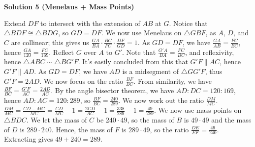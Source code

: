 \begin{enumerate}
\textbf{Solution 5 (Menelaus + Mass Points)}

Extend $DF$ to intersect with the extension of $AB$ at $G$. Notice that $\triangle{BDF} \cong \triangle{BDG}$, so $GD=DF$. We now use Menelaus on $\triangle{GBF}$, as $A$, $D$, and $C$ are collinear; this gives us $\frac{GA}{BA} \cdot \frac{BC}{FC} \cdot \frac{DF}{GD}=1$. As $GD=DF$, we have $\frac{GA}{AB}=\frac{FC}{BC}$, hence $\frac{GA}{120}=\frac{FC}{169}$. Reflect $G$ over $A$ to $G'$. Note that $\frac{G'A}{BA}=\frac{FC}{BC}$, and reflexivity, hence $\triangle{ABC} \sim \triangle{BG'F}$. It's easily concluded from this that $G'F \parallel AC$, hence $G'F \parallel AD$. As $GD=DF$, we have $AD$ is a midsegment of $\triangle{GG'F}$, thus $G'F = 2AD$. We now focus on the ratio $\frac{BF}{BC}$. From similarity, we have $\frac{BF}{BC}=\frac{G'F}{AC}=\frac{2AD}{AC}$. By the angle bisector theorem, we have $AD:DC=120:169$, hence $AD:AC=120:289$, so $\frac{BF}{BC}=\frac{240}{289}$. We now work out the ratio $\frac{DM}{MC}$. $\frac{DM}{MC}=\frac{CD-MC}{MC}=\frac{CD}{MC}-1=\frac{2CD}{AC}-1=\frac{338}{289}-1=\frac{49}{289}$. We now use mass points on $\triangle{BDC}$. We let the mass of $C$ be $240\cdot 49$, so the mass of $B$ is $49 \cdot 49$ and the mass of $D$ is $289\cdot 240$. Hence, the mass of $F$ is $289\cdot 49$, so the ratio $\frac{DE}{EF}=\frac{49}{240}$. Extracting gives $49+240=\boxed{289}.$



\end{enumerate}